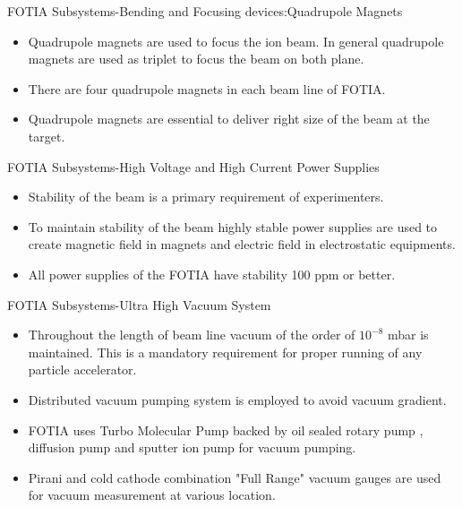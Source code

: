\documentclass[11pt]{beamer}
\begin{document}
\begin{frame}{FOTIA Subsystems-Bending and Focusing devices:Quadrupole Magnets}

  \begin{itemize}
 
    \item Quadrupole magnets are used to focus the ion beam. In general quadrupole magnets are used as triplet to focus the beam on both plane.
    \item There are four quadrupole magnets in each beam line of FOTIA.  
    \item Quadrupole magnets are essential to deliver right size of the beam at the target. 
      
   \end{itemize}

\end{frame}



\begin{frame}{FOTIA Subsystems-High Voltage and High Current Power Supplies}

  \begin{itemize}
      
    \item Stability of the beam is a primary requirement of experimenters.
    \item To maintain stability of the beam highly stable power supplies are used to create magnetic field in magnets and electric field in electrostatic equipments. 
    \item All power supplies of the FOTIA have stability 100 ppm or better.
           
   \end{itemize}

\end{frame}


\begin{frame}{FOTIA Subsystems-Ultra High Vacuum System}

  \begin{itemize}
      
    \item Throughout the length of beam line vacuum of the order of $10^{-8}$ mbar is maintained. This is a mandatory requirement for proper running of any particle accelerator.
    \item Distributed vacuum pumping system is employed to avoid vacuum gradient. 
    \item FOTIA uses Turbo Molecular Pump backed by oil sealed rotary pump , diffusion pump and sputter ion pump for vacuum pumping.
    \item Pirani and cold cathode combination "Full Range" vacuum gauges are used for vacuum measurement at various location.
           
   \end{itemize}

\end{frame}
\end{document}
